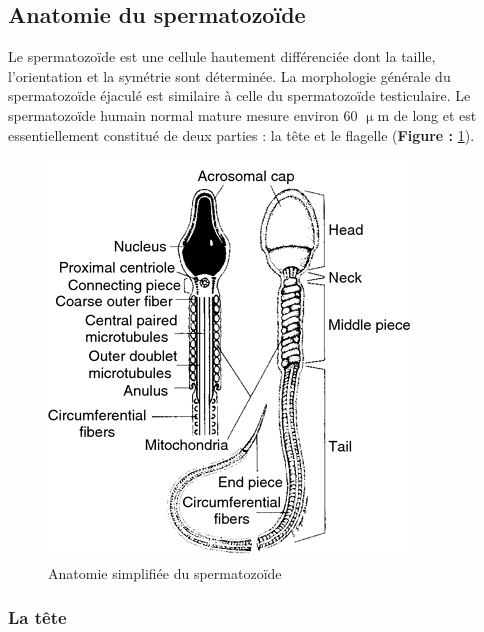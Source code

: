 \documentclass[12pt,twoside]{reedthesis}
\theoremstyle{definition}
\theoremstyle{definition}
\theoremstyle{remark}
\begin{document}
  \subsection{Anatomie du spermatozoïde}\label{anatomie-du-spermatozoide}
  
  Le spermatozoïde est une cellule hautement différenciée dont la taille,
  l'orientation et la symétrie sont déterminée. La morphologie générale du
  spermatozoïde éjaculé est similaire à celle du spermatozoïde
  testiculaire. Le spermatozoïde humain normal mature mesure environ 60
  \(\upmu\)m de long et est essentiellement constitué de deux parties : la
  tête et le flagelle (\textbf{Figure : }\ref{fig:spz}).
  
  \begin{figure}
  
  {\centering \includegraphics[scale=.75]{figure/sperm_anatomy} 
  
  }
  
  \caption[Anatomie simplifiée du spermatozoïde]{Anatomie simplifiée du spermatozoïde}\label{fig:spz}
  \end{figure}
  
  \subsubsection{La tête}\label{la-tete}
  
\end{document}
